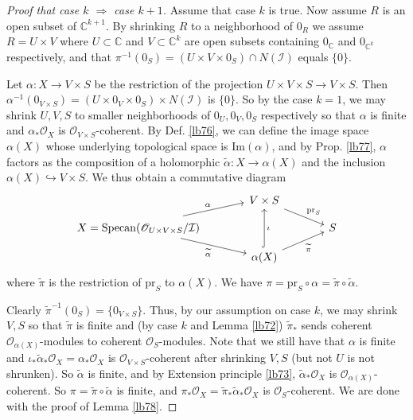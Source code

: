 \documentclass[12pt,b5paper,notitlepage]{report}
\theoremstyle{definition}
\theoremstyle{plain}
\newcommand{\mc}{\mathcal}
\newcommand{\wtd}{\widetilde}
\newcommand{\scr}{\mathscr}
\newcommand{\Cbb}{\mathbb C}
\newcommand{\pr}{\mathrm {pr}}
\newcommand{\Imag}{\mathrm{Im}}
\newcommand{\Specan}{\mathrm{Specan}}
\numberwithin{equation}{section}
\begin{document}
\begin{proof}[Proof that case $k$ $\Rightarrow$ case $k+1$]
Assume that case $k$ is true. Now assume $R$ is an open subset of $\Cbb^{k+1}$. By shrinking $R$ to a neighborhood of $0_R$ we assume $R=U\times V$ where $U\subset\Cbb$ and $V\subset\Cbb^k$ are open subsets containing $0_\Cbb$ and $0_{\Cbb^k}$ respectively, and that $\pi^{-1}(0_S)=(U\times V\times 0_S)\cap N(\mc I)$ equals $\{0\}$. 

Let $\alpha:X\rightarrow V\times S$ be the restriction of the projection $U\times V\times S\rightarrow V\times S$. Then $\alpha^{-1}(0_{V\times S})=(U\times 0_V\times 0_S)\times N(\mc I)$ is $\{0\}$. So by the case $k=1$, we may shrink $U,V,S$ to smaller neighborhoods of $0_U,0_V,0_S$ respectively so that $\alpha$ is finite and $\alpha_*\scr O_X$ is $\scr O_{V\times S}$-coherent. By Def. \ref{lb76}, we can define the image space $\alpha(X)$  whose underlying topological space is $\Imag(\alpha)$, and by Prop. \ref{lb77}, $\alpha$ factors as the composition of a holomorphic $\wtd\alpha:X\rightarrow\alpha(X)$ and the inclusion $\alpha(X)\hookrightarrow V\times S$. We thus obtain a commutative diagram
\begin{equation*}
\begin{tikzcd}[row sep=small,column sep=large]
                                                             & V\times S \arrow[rd, "\pr_S"]                     &   \\
X=\Specan(\scr O_{U\times V\times S}/\mc I) \arrow[ru, "\alpha", shift left] \arrow[rd, "\wtd\alpha"'] &                                                   & S \\
                                                             & \alpha(X) \arrow[ru, "\wtd\pi"'] \arrow[uu, hook, "\iota"'] &  
\end{tikzcd}
\end{equation*}
where $\wtd\pi$ is the restriction of $\pr_S$ to $\alpha(X)$. We have $\pi=\pr_S\circ\alpha=\wtd\pi\circ\wtd\alpha$.

Clearly $\wtd\pi^{-1}(0_S)=\{0_{V\times S}\}$. Thus, by our assumption on case $k$, we may shrink $V,S$ so that $\wtd\pi$ is finite and (by case $k$ and Lemma \ref{lb72}) $\wtd\pi_*$ sends coherent $\scr O_{\alpha(X)}$-modules to coherent $\scr O_S$-modules. Note that we still have that $\alpha$ is finite and $\iota_*\wtd\alpha_*\scr O_X=\alpha_*\scr O_X$ is $\scr O_{V\times S}$-coherent after shrinking $V,S$ (but not $U$ is not shrunken). So $\wtd\alpha$ is finite, and by Extension principle \ref{lb73}, $\wtd\alpha_*\scr O_X$ is $\scr O_{\alpha(X)}$-coherent. So $\pi=\wtd\pi\circ\wtd\alpha$ is finite, and $\pi_*\scr O_X=\wtd\pi_*\wtd\alpha_*\scr O_X$ is $\scr O_S$-coherent. We are done with the proof of Lemma \ref{lb78}.
\end{proof}
\end{document}
